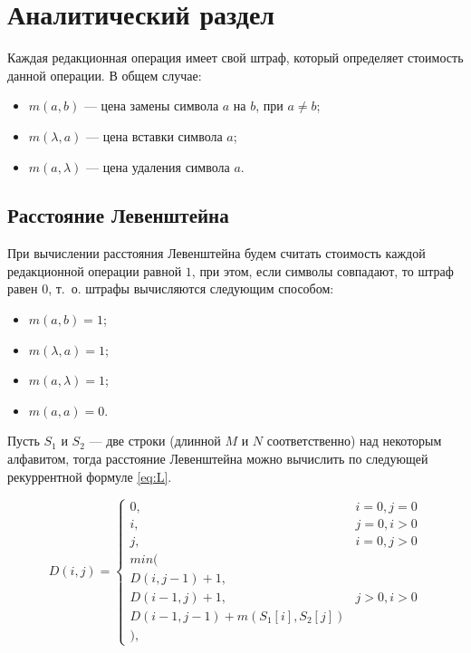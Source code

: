 \chapter{Аналитический раздел}

Каждая редакционная операция имеет свой штраф, который определяет стоимость данной операции.
В общем случае:
\begin{itemize}
	\item $ m(a, b) $ --- цена замены символа $ a $ на $ b $, при $ a \ne b $;
	\item $ m(\lambda, a) $ --- цена вставки символа $ a $;
	\item $ m(a, \lambda) $ --- цена удаления символа $ a $.
\end{itemize}


\section{Расстояние Левенштейна}

При вычислении расстояния Левенштейна будем считать стоимость каждой редакционной операции равной $ 1 $, при этом, если символы совпадают, то штраф равен $0$, т.~о. штрафы вычисляются следующим способом:
\begin{itemize}
	\item $ m(a, b) = 1 $;
	\item $ m(\lambda, a) = 1 $;
	\item $ m(a, \lambda) = 1 $;
	\item $ m(a, a) = 0 $.
\end{itemize}

Пусть $S_1$ и $S_2$ --- две строки (длинной $M$ и $N$ соответственно) над некоторым алфавитом, тогда расстояние Левенштейна можно вычислить по следующей рекуррентной формуле \eqref{eq:L}.

\begin{equation}
	\label{eq:L}
	D(i,j) = \left\{ \begin{array}{ll}
		0, & \textrm{$i = 0, j = 0$}\\
		i, & \textrm{$j = 0, i > 0$}\\
		j, & \textrm{$i = 0, j > 0$}\\
		min(\\
		D(i,j-1)+1,\\
		D(i-1, j) +1, &\textrm{$j>0, i>0$}\\
		D(i-1, j-1) + m(S_{1}[i], S_{2}[j])\\
		),
	\end{array} \right.
\end{equation}

